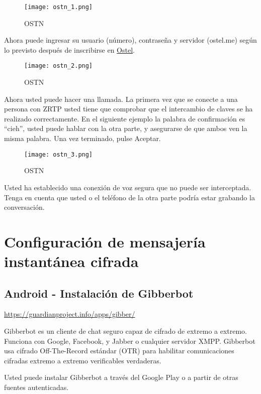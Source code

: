 \documentclass[10pt,a5paper,twoside,,]{book}
\begin{document}
\begin{figure}[htbp]
\centering
\texttt{[image: ostn\_1.png]}
\caption{OSTN}
\end{figure}

Ahora puede ingresar su usuario (número), contraseña y servidor
(ostel.me) según lo previsto después de inscribirse en
\href{https://ostel.me/users/sign_up}{Ostel}.

\begin{figure}[htbp]
\centering
\texttt{[image: ostn\_2.png]}
\caption{OSTN}
\end{figure}

Ahora usted puede hacer una llamada. La primera vez que se conecte a una
persona con ZRTP usted tiene que comprobar que el intercambio de claves
se ha realizado correctamente. En el siguiente ejemplo la palabra de
confirmación es ``cieh'', usted puede hablar con la otra parte, y
asegurarse de que ambos ven la misma palabra. Una vez terminado, pulse
Aceptar.

\begin{figure}[htbp]
\centering
\texttt{[image: ostn\_3.png]}
\caption{OSTN}
\end{figure}

Usted ha establecido una conexión de voz segura que no puede ser
interceptada. Tenga en cuenta que usted o el teléfono de la otra parte
podría estar grabando la conversación.

\chapter{Configuración de mensajería instantánea
cifrada}\label{configuraciuxf3n-de-mensajeruxeda-instantuxe1nea-cifrada}

\section{Android - Instalación de
Gibberbot}\label{android---instalaciuxf3n-de-gibberbot}

\url{https://guardianproject.info/apps/gibber/}

Gibberbot es un cliente de chat seguro capaz de cifrado de extremo a
extremo. Funciona con Google, Facebook, y Jabber o cualquier servidor
XMPP. Gibberbot usa cifrado Off-The-Record estándar (OTR) para habilitar
comunicaciones cifradas extremo a extremo verificables verdaderas.

Usted puede instalar Gibberbot a través del Google Play o a partir de
otras fuentes autenticadas.
\end{document}
